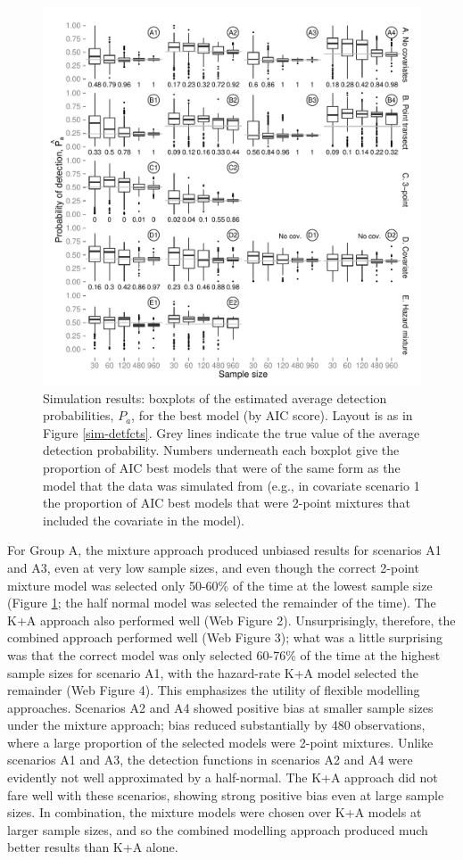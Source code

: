 \documentclass[useAMS,referee,usenatbib]{biom}
\begin{document}
\begin{figure}
\centering
\includegraphics[width=\textwidth]{simulations/pa-plot.pdf}
\caption{Simulation results: boxplots of the estimated average detection probabilities, $P_a$, for the best model (by AIC score). Layout is as in Figure \ref{sim-detfcts}. Grey lines indicate the true value of the average detection probability. Numbers underneath each boxplot give the proportion of AIC best models that were of the same form as the model that the data was simulated from (e.g., in covariate scenario 1 the proportion of AIC best models that were 2-point mixtures that included the covariate in the model).}
\label{sim-boxplots}
\end{figure}

For Group A, the mixture approach produced unbiased results for scenarios A1 and A3, even at very low sample sizes, and even though the correct 2-point mixture model was selected only 50-60\% of the time at the lowest sample size (Figure \ref{sim-boxplots}; the half normal model was selected the remainder of the time).  The K+A approach also performed well (Web Figure 2). Unsurprisingly, therefore, the combined approach performed well (Web Figure 3); what was a little surprising was that the correct model was only selected 60-76\% of the time at the highest sample sizes for scenario A1, with the hazard-rate K+A model selected the remainder (Web Figure 4). This emphasizes the utility of flexible modelling approaches. Scenarios A2 and A4 showed positive bias at smaller sample sizes under the mixture approach; bias reduced substantially by 480 observations, where a large proportion of the selected models were 2-point mixtures. Unlike scenarios A1 and A3, the detection functions in scenarios A2 and A4 were evidently not well approximated by a half-normal. The K+A approach did not fare well with these scenarios, showing strong positive bias even at large sample sizes. In combination, the mixture models were chosen over K+A models at larger sample sizes, and so the combined modelling approach produced much better results than K+A alone.  
\end{document}
